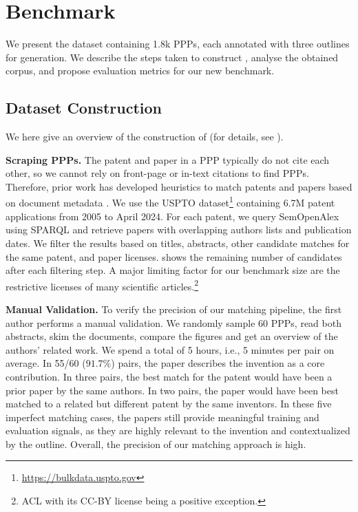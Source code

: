 \section{\DatasetName{} Benchmark}

We present the \DatasetName dataset containing 1.8k PPPs, each annotated with three outlines for generation.
We describe the steps taken to construct \DatasetName, analyse the obtained corpus, and propose evaluation metrics for our new benchmark.

\subsection{Dataset Construction}
We here give an overview of the construction of \DatasetName (for details, see ).

\noindent\textbf{Scraping PPPs. }
The patent and paper in a PPP typically do not cite each other, so we cannot rely on front-page or in-text citations \cite{marxRelianceScienceWorldwide2020, marxRelianceScienceInventors2022} to find PPPs.
Therefore, prior work has developed heuristics to match patents and papers based on document metadata \cite{magermanExploringFeasibilityAccuracy2010,vanlooyAssessmentLatentSemantic2011}.
We use the USPTO dataset\footnote{\url{https://bulkdata.uspto.gov}} containing 6.7M patent applications from 2005 to April 2024.
For each patent, we query SemOpenAlex \cite{farberSemOpenAlexScientificLandscape2023a} using SPARQL and retrieve papers with overlapping authors lists and publication dates.
We filter the results based on titles, abstracts, other candidate matches for the same patent, and paper licenses.
 shows the remaining number of candidates after each filtering step.
A major limiting factor for our benchmark size are the restrictive licenses of many scientific articles.\footnote{ACL with its CC-BY license being a positive exception.}


\noindent\textbf{Manual Validation. }
To verify the precision of our matching pipeline, the first author performs a manual validation.
We randomly sample 60 PPPs, read both abstracts, skim the documents, compare the figures and get an overview of the authors' related work. 
We spend a total of 5 hours, i.e., 5 minutes per pair on average.
In 55/60 ($91.7\%$) pairs, the paper describes the invention as a core contribution.
In three pairs, the best match for the patent would have been a prior paper by the same authors.
In two pairs, the paper would have been best matched to a related but different patent by the same inventors.
In these five imperfect matching cases, the papers still provide meaningful training and evaluation signals, as they are highly relevant to the invention and contextualized by the outline.
Overall, the precision of our matching approach is high.



